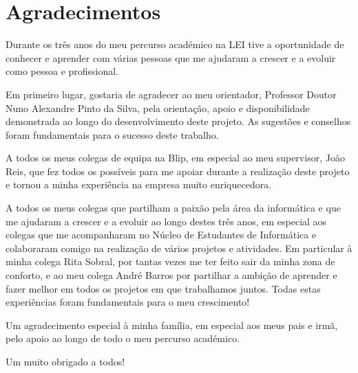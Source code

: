 \titleformat{\chapter}[display]
{\normalfont\bfseries}{}{0pt}{\Huge}

\chapter*{Agradecimentos}

Durante os três anos do meu percurso académico na \ac{LEI} tive a oportunidade de conhecer e
aprender com várias pessoas que me ajudaram a crescer e a evoluir como pessoa e profissional.

Em primeiro lugar, gostaria de agradecer ao meu orientador, Professor Doutor Nuno Alexandre
Pinto da Silva, pela orientação, apoio e disponibilidade demonstrada ao longo do desenvolvimento 
deste projeto. As sugestões e conselhos foram fundamentais para o sucesso deste trabalho.

A todos os meus colegas de equipa na Blip, em especial ao meu supervisor, João Reis, que fez todos
os possíveis para me apoiar durante a realização deste projeto e tornou a minha experiência na
empresa muito enriquecedora.

A todos os meus colegas que partilham a paixão pela área da informática e que me ajudaram a crescer
e a evoluir ao longo destes três anos, em especial aos colegas que me acompanharam no Núcleo de 
Estudantes de Informática e colaboraram comigo na realização de vários projetos e atividades. Em
particular à minha colega Rita Sobral, por tantas vezes me ter feito sair da minha zona de conforto, 
e ao meu colega André Barros por partilhar a ambição de aprender e fazer melhor em todos os projetos 
em que trabalhamos juntos. Todas estas experiências foram fundamentais para o meu crescimento!

Um agradecimento especial à minha família, em especial aos meus pais e irmã, pelo apoio ao longo 
de todo o meu percurso académico.

Um muito obrigado a todos!

